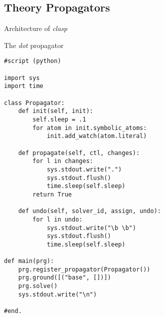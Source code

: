 \documentclass[t,fleqn]{beamer}
\begin{document}
\subsection{Theory Propagators}
\begin{frame}[c]{Architecture of \textit{clasp}}

\end{frame}
\begin{frame}[fragile,shrink=1]{The \textit{dot} propagator}
\begin{lstlisting}[linebackgroundcolor={%
      \btLstHL<1>{26-28}%
      \btLstHL<2>{7-10}%
      \btLstHL<3>{12-17}%
      \btLstHL<4>{19-23}%
    }]
#script (python)

import sys
import time

class Propagator:
    def init(self, init):
        self.sleep = .1
        for atom in init.symbolic_atoms:
            init.add_watch(atom.literal)

    def propagate(self, ctl, changes):
        for l in changes:
            sys.stdout.write(".")
            sys.stdout.flush()
            time.sleep(self.sleep)
        return True

    def undo(self, solver_id, assign, undo):
        for l in undo:
            sys.stdout.write("\b \b")
            sys.stdout.flush()
            time.sleep(self.sleep)

def main(prg):
    prg.register_propagator(Propagator())
    prg.ground([("base", [])])
    prg.solve()
    sys.stdout.write("\n")

#end.
\end{lstlisting}
\end{frame}
\end{document}
